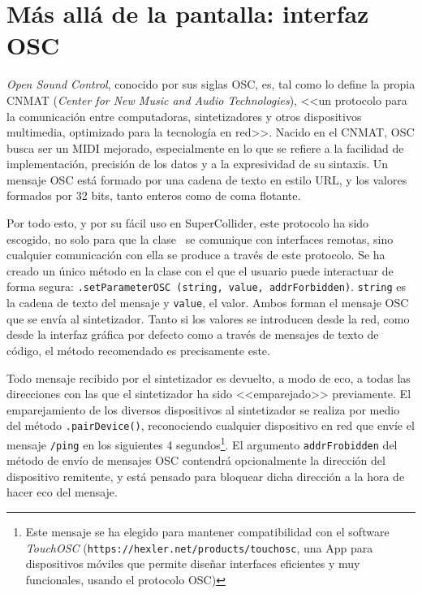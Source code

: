 \section[Interfaz OSC]{Más allá de la pantalla: interfaz OSC}

\textit{Open Sound Control}, conocido por sus siglas OSC, es, tal como lo define la propia CNMAT (\textit{Center for New Music and Audio Technologies}), <<un protocolo para la comunicación entre computadoras, sintetizadores y otros dispositivos multimedia, optimizado para la tecnología en red>>. Nacido en el CNMAT, OSC busca ser un MIDI mejorado, especialmente en lo que se refiere a la facilidad de implementación, precisión de los datos y a la expresividad de su sintaxis. Un mensaje OSC está formado por una cadena de texto en estilo URL, y los valores formados por 32 bits, tanto enteros como de coma flotante. 

Por todo esto, y por su fácil uso en SuperCollider, este protocolo ha sido escogido, no solo para que la clase \className\  se comunique con interfaces remotas, sino cualquier comunicación con ella se produce a través de este protocolo. Se ha creado un único método en la clase con el que el usuario puede interactuar de forma segura: \texttt{\className.setParameterOSC (string, value, addrForbidden)}. \texttt{string} es la cadena de texto del mensaje y \texttt{value}, el valor. Ambos forman el mensaje OSC que se envía al sintetizador. Tanto si los valores se introducen desde la red, como desde la interfaz gráfica por defecto como a través de mensajes de texto de código, el método recomendado es precisamente este.

Todo mensaje recibido por el sintetizador es devuelto, a modo de eco, a todas las direcciones con las que el sintetizador ha sido <<emparejado>> previamente. El emparejamiento de los diversos dispositivos al sintetizador se realiza por medio del método \texttt{\className.pairDevice()}, reconociendo cualquier dispositivo en red que envíe el mensaje \texttt{/ping} en los siguientes 4 segundos\footnote{Este mensaje se ha elegido para mantener compatibilidad con el software \textit{TouchOSC} (\texttt{https://hexler.net/products/touchosc}, una App para dispositivos móviles que permite diseñar interfaces eficientes y muy funcionales, usando el protocolo OSC)}. El argumento \texttt{addrFrobidden} del método de envío de mensajes OSC contendrá opcionalmente la dirección del dispositivo remitente, y está pensado para bloquear dicha dirección a la hora de hacer eco del mensaje.

